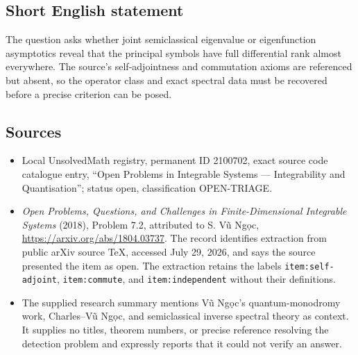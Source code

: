 \documentclass[11pt]{article}
\begin{document}
\subsection{Short English statement}
The question asks whether joint semiclassical eigenvalue or eigenfunction asymptotics reveal that the principal symbols have full differential rank almost everywhere. The source's self-adjointness and commutation axioms are referenced but absent, so the operator class and exact spectral data must be recovered before a precise criterion can be posed.
\subsection{Sources}
\begin{itemize}
\item Local UnsolvedMath registry, permanent ID 2100702, exact source code catalogue entry, ``Open Problems in Integrable Systems --- Integrability and Quantisation''; status open, classification OPEN-TRIAGE.
\item \emph{Open Problems, Questions, and Challenges in Finite-Dimensional Integrable Systems} (2018), Problem 7.2, attributed to S. V\~u Ng\d{o}c, \url{https://arxiv.org/abs/1804.03737}. The record identifies extraction from public arXiv source TeX, accessed July 29, 2026, and says the source presented the item as open. The extraction retains the labels \texttt{item:self-adjoint}, \texttt{item:commute}, and \texttt{item:independent} without their definitions.
\item The supplied research summary mentions V\~u Ng\d{o}c's quantum-monodromy work, Charles--V\~u Ng\d{o}c, and semiclassical inverse spectral theory as context. It supplies no titles, theorem numbers, or precise reference resolving the detection problem and expressly reports that it could not verify an answer.
\end{itemize}
\end{document}

